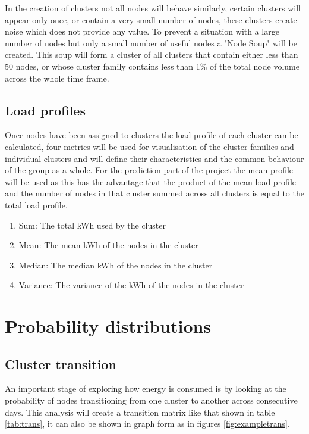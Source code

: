 In the creation of clusters not all nodes will behave similarly, certain clusters will appear only once, or contain a very small number of nodes, these clusters create noise which does not provide any value. To prevent a situation with a large number of nodes but only a small number of useful nodes a "Node Soup" will be created. This soup will form a cluster of all clusters that contain either less than 50 nodes, or whose cluster family contains less than 1\% of the total node volume across the whole time frame.


\subsection{Load profiles}
\label{sec:LoadProfiles}
Once nodes have been assigned to clusters the load profile of each cluster can be calculated, four metrics will be used for visualisation of the cluster families and individual clusters and will define their characteristics and the common behaviour of the group as a whole. For the prediction part of the project the mean profile will be used as this has the advantage that the product of the mean load profile and the number of nodes in that cluster summed across all clusters is equal to the total load profile.

\begin{enumerate}
\item Sum: The total kWh used by the cluster
\item Mean: The mean kWh of the nodes in the cluster
\item Median: The median kWh of the nodes in the cluster
\item Variance: The variance of the kWh of the nodes in the cluster
\end{enumerate}

\section{Probability distributions}

\subsection{Cluster transition}
\label{sec:Clusttrans}
An important stage of exploring how energy is consumed is by looking at the probability of nodes transitioning from one cluster to another across consecutive days. This analysis will create a transition matrix like that shown in table \ref{tab:trans}, it can also be shown in graph form as in figures \ref{fig:exampletrans}. 

